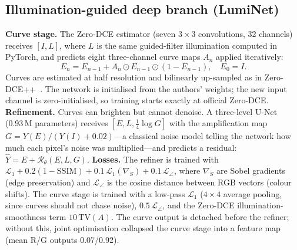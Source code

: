 \documentclass[conference]{IEEEtran}
\begin{document}
\subsection{Illumination-guided deep branch (LumiNet)}
\textbf{Curve stage.} The Zero-DCE estimator (seven $3\times3$ convolutions, 32 channels) receives $[I, L]$, where $L$
is the same guided-filter illumination computed in PyTorch, and predicts eight three-channel curve maps $A_n$ applied
iteratively:
\begin{equation}
E_n = E_{n-1} + A_n \odot E_{n-1}\odot(1-E_{n-1}),\quad E_0=I .
\end{equation}
Curves are estimated at half resolution and bilinearly up-sampled as in Zero-DCE++~\cite{li2022zerodcepp}. The
network is initialised from the authors' weights; the new input channel is zero-initialised, so training starts
exactly at official Zero-DCE. \textbf{Refinement.} Curves can brighten but cannot denoise. A three-level
U-Net~\cite{ronneberger2015unet} (0.93\,M parameters) receives $[E, L, \tfrac14\log G]$ with the amplification map
$G=Y(E)/(Y(I)+0.02)$---a classical noise model telling the network how much each pixel's noise was multiplied---and
predicts a residual: $\hat Y = E + \mathcal{R}_\theta(E,L,G)$.
\textbf{Losses.} The refiner is trained with $\mathcal{L}_1+0.2(1-\mathrm{SSIM})+0.1\,\mathcal{L}_1(\nabla_{\!S})
+0.1\,\mathcal{L}_{\angle}$, where $\nabla_{\!S}$ are Sobel gradients (edge preservation) and $\mathcal{L}_{\angle}$
is the cosine distance between RGB vectors (colour shifts). The curve stage is trained with a low-pass
$\mathcal{L}_1$ ($4\times4$ average pooling, since curves should not chase noise), $0.5\,\mathcal{L}_{\angle}$, and the
Zero-DCE illumination-smoothness term $10\,\mathrm{TV}(A)$. The curve output is detached before the refiner; without
this, joint optimisation collapsed the curve stage into a feature map (mean R/G outputs 0.07/0.92).
\end{document}
